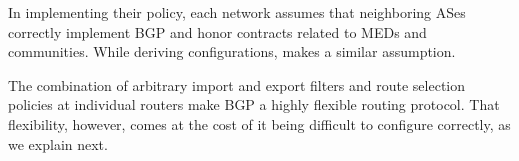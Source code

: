 In implementing their policy, each network assumes that neighboring ASes correctly implement BGP and honor contracts related to MEDs and communities. While deriving configurations, \sysname makes a similar assumption.
 
The combination of arbitrary import and export filters and route selection policies at individual routers make BGP a highly flexible routing protocol. That flexibility, however, comes at the cost of it being difficult to configure correctly, as we explain next.
